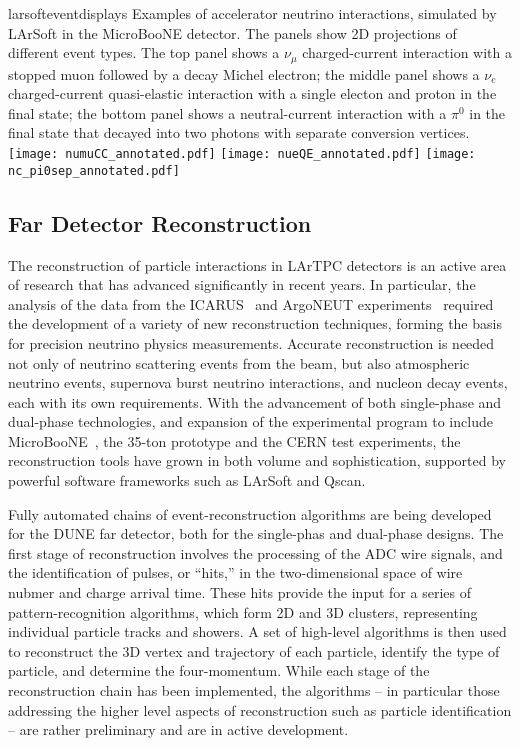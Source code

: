 \begin{cdrfigure}{larsofteventdisplays}
{Examples of accelerator neutrino interactions, simulated by LArSoft in the 
MicroBooNE detector. The panels show 2D projections of different event types.
The top panel shows a $\nu_{\mu}$ charged-current interaction with a stopped muon followed
by a decay Michel electron; the middle panel shows a $\nu_{e}$ charged-current 
quasi-elastic interaction with a single electon and proton in the final state;
the bottom panel shows a neutral-current interaction with a $\pi^{0}$ in the final state
that decayed into two photons with separate conversion vertices.}
\texttt{[image: numuCC\_annotated.pdf]}
\texttt{[image: nueQE\_annotated.pdf]}
\texttt{[image: nc\_pi0sep\_annotated.pdf]}
\end{cdrfigure}

\subsection{Far Detector Reconstruction}
\label{sec:detectors-sc-physics-software-reconstruction-fd}

The reconstruction of particle interactions in LArTPC
detectors is an active area of research that has advanced significantly in recent years.
In particular, the analysis of the data from the ICARUS~\cite{Amerio:2004ze,icarus-url,ICARUS-pizero,Antonello:2012hu} 
and ArgoNEUT experiments~\cite{Adamson:2013/02/28tla,argoneut-url,Acciarri:2013met}
required the development of a variety of new reconstruction techniques,
forming the basis for precision neutrino physics measurements.
Accurate reconstruction is needed not only of neutrino scattering events from the beam, but also atmospheric neutrino events,
supernova burst neutrino interactions, and nucleon decay events, each with its own requirements.
With the advancement of both single-phase and dual-phase technologies,
and expansion of the experimental program to include MicroBooNE~\cite{Chen:2007ae,microboone-url},
the 35-ton prototype and the CERN test experiments,
the reconstruction tools have grown in both volume and sophistication,
supported by powerful software frameworks such as LArSoft and Qscan.

Fully automated chains of event-reconstruction algorithms
are being developed for the DUNE far detector, both for the single-phas and dual-phase designs.
The first stage of reconstruction involves the processing of the
ADC wire signals, and the identification of pulses, or ``hits,'' in the 
two-dimensional space of wire nubmer and charge arrival time. 
These hits provide the input for a series of pattern-recognition algorithms,
which form 2D and 3D clusters, representing individual particle tracks and showers.
A set of high-level algorithms is then used to reconstruct the 
3D vertex and trajectory of each particle, identify the type of particle, and determine the four-momentum.
While each stage of the reconstruction chain has been implemented, the algorithms -- in
particular those addressing the higher level aspects of reconstruction such as particle identification -- are
rather preliminary and are in active development.


